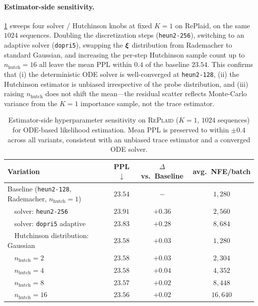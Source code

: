 \documentclass{article}
\begin{document}
\paragraph{Estimator-side sensitivity.} \cref{tab:ode-sensitivity} sweeps four solver / Hutchinson knobs at fixed $K=1$ on RePlaid, on the same $1024$ sequences. Doubling the discretization steps (\texttt{heun2-256}), switching to an adaptive solver (\texttt{dopri5}), swapping the ${\boldsymbol{\xi}}$ distribution from Rademacher to standard Gaussian, and increasing the per-step Hutchinson sample count up to $n_\mathrm{hutch}=16$ all leave the mean PPL within $0.4$ of the baseline $23.54$. This confirms that (i) the deterministic ODE solver is well-converged at \texttt{heun2-128}, (ii) the Hutchinson estimator is unbiased irrespective of the probe distribution, and (iii) raising $n_\mathrm{hutch}$ does not shift the mean---the residual scatter reflects Monte-Carlo variance from the $K=1$ importance sample, not the trace estimator.
%

\begin{table}[h]
\centering
\caption{\small Estimator-side hyperparameter sensitivity on \textsc{RePlaid} ($K=1$, $1024$ sequences) for ODE-based likelihood estimation. Mean PPL is preserved to within $\pm 0.4$ across all variants, consistent with an unbiased trace estimator and a converged ODE solver.}
\begin{tabular}{l c c c}
\toprule
Variation                                  & PPL$\downarrow$ & $\Delta$ vs.\ Baseline & avg.\ NFE/batch \\
\midrule
Baseline (\texttt{heun2-128}, Rademacher, $n_\mathrm{hutch}=1$) & $23.54$ & $-$        & $1{,}280$  \\
~~solver: \texttt{heun2-256}                   & $23.91$ & $+0.36$           & $2{,}560$  \\
~~solver: \texttt{dopri5} adaptive             & $23.83$ & $+0.28$           & $8{,}684$  \\
~~Hutchinson distribution: Gaussian            & $23.58$ & $+0.03$           & $1{,}280$  \\
~~$n_\mathrm{hutch}=2$                         & $23.58$ & $+0.03$           & $2{,}304$  \\
~~$n_\mathrm{hutch}=4$                         & $23.58$ & $+0.04$           & $4{,}352$  \\
~~$n_\mathrm{hutch}=8$                         & $23.57$ & $+0.02$           & $8{,}448$  \\
~~$n_\mathrm{hutch}=16$                        & $23.56$ & $+0.02$           & $16{,}640$ \\
\bottomrule
\end{tabular}
\vspace{0.5em}
\label{tab:ode-sensitivity}
\end{table}
\end{document}
